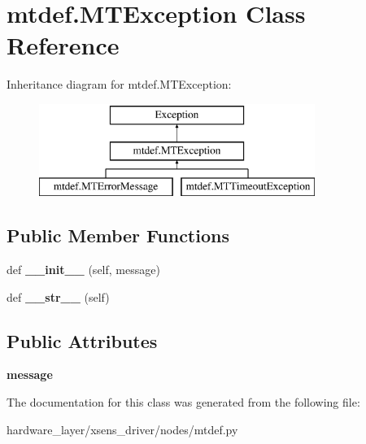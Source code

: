 \hypertarget{classmtdef_1_1MTException}{}\section{mtdef.\+M\+T\+Exception Class Reference}
\label{classmtdef_1_1MTException}
Inheritance diagram for mtdef.\+M\+T\+Exception\+:\begin{figure}[H]
\begin{center}
\leavevmode
\includegraphics[height=3.000000cm]{classmtdef_1_1MTException}
\end{center}
\end{figure}
\subsection*{Public Member Functions}
\begin{DoxyCompactItemize}
\item 
\mbox{\label{classmtdef_1_1MTException_aef2c8ab0a8238f7caee863fedbc6aa4a}} 
def {\bfseries \+\_\+\+\_\+init\+\_\+\+\_\+} (self, message)
\item 
\mbox{\label{classmtdef_1_1MTException_ae945e5f5e231393ce05d1adc5d6cdd94}} 
def {\bfseries \+\_\+\+\_\+str\+\_\+\+\_\+} (self)
\end{DoxyCompactItemize}
\subsection*{Public Attributes}
\begin{DoxyCompactItemize}
\item 
\mbox{\label{classmtdef_1_1MTException_a5be6e05c2fd6b471ea167b25afad9f2d}} 
{\bfseries message}
\end{DoxyCompactItemize}


The documentation for this class was generated from the following file\+:\begin{DoxyCompactItemize}
\item 
hardware\+\_\+layer/xsens\+\_\+driver/nodes/mtdef.\+py\end{DoxyCompactItemize}
